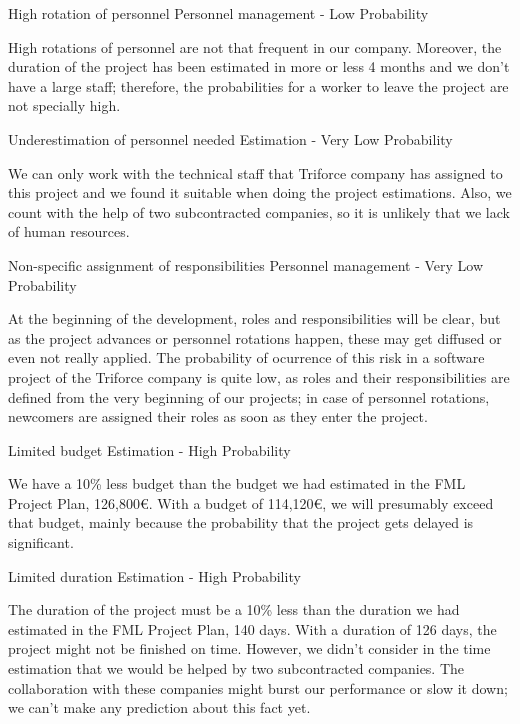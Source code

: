 \begin{risk}{High rotation of personnel}
\riskcat Personnel management
 - Low Probability

High rotations of personnel are not that frequent in our company. Moreover, the duration of the project has been estimated in more or less 4 months and we don't have a large staff; therefore, the probabilities for a worker to leave the project are not specially high.
\end{risk}

\begin{risk}{Underestimation of personnel needed}
\riskcat Estimation
 - Very Low Probability

We can only work with the technical staff that Triforce company has assigned to this project and we found it suitable when doing the project estimations. Also, we count with the help of two subcontracted companies, so it is unlikely that we lack of human resources.
\end{risk}

\begin{risk}{Non-specific assignment of responsibilities}
\riskcat Personnel management
 - Very Low Probability

At the beginning of the development, roles and responsibilities will be clear, but as the project advances or personnel rotations happen, these may get diffused or even not really applied. The probability of ocurrence of this risk in a software project of the Triforce company is quite low, as roles and their responsibilities are defined from the very beginning of our projects; in case of personnel rotations, newcomers are assigned their roles as soon as they enter the project.
\end{risk}

\begin{risk}{Limited budget}
\riskcat Estimation
 - High Probability

We have a 10\% less budget than the budget we had estimated in the FML Project Plan,  126,800\euro. With a budget of 114,120\euro, we will presumably exceed that budget, mainly because the probability that the project gets delayed is significant.
\end{risk}

\begin{risk}{Limited duration}
\riskcat Estimation
 - High Probability

The duration of the project must be a 10\% less than the duration we had estimated in the FML Project Plan, 140 days. With a duration of 126 days, the project might not be finished on time. However, we didn't consider in the time estimation that we would be helped by two subcontracted companies. The collaboration with these companies might burst our performance or slow it down; we can't make any prediction about this fact yet.
\end{risk}



